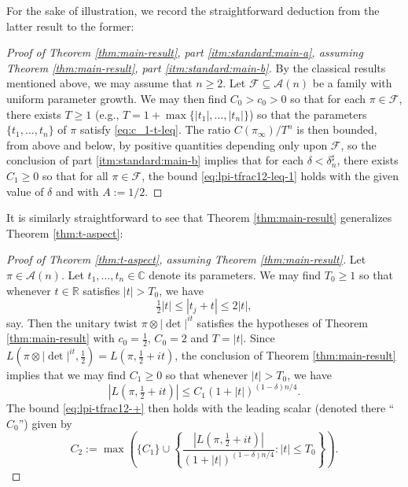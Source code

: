 For the sake of illustration, we record the straightforward deduction from the latter result to the former:
\begin{proof}[Proof of Theorem \ref{thm:main-result}, part \eqref{itm:standard:main-a}, assuming Theorem \ref{thm:main-result}, part \eqref{itm:standard:main-b}]
  By the classical results mentioned above, we may assume that $n \geq 2$.  Let $\mathcal{F} \subseteq \mathcal{A}(n)$ be a family with uniform parameter growth.  We may then find $C_0 > c_0 > 0$ so that for each $\pi \in \mathcal{F}$, there exists $T \geq 1$ (e.g., $T = 1 + \max \{|t_1|, \dotsc, |t_n|\}$) so that the parameters $\{t_1,\dotsc,t_n\}$ of $\pi$ satisfy \eqref{eq:c_1-t-leq}.  The ratio $C(\pi_\infty) / T^n$ is then bounded, from above and below, by positive quantities depending only upon $\mathcal{F}$, so the conclusion of part \eqref{itm:standard:main-b} implies that for each $\delta < \delta_n^\sharp$, there exists $C_1 \geq 0$ so that for all $\pi \in \mathcal{F}$, the bound \eqref{eq:lpi-tfrac12-leq-1} holds with the given value of $\delta$ and with $A := 1/2$.
\end{proof}

It is similarly straightforward to see that Theorem \ref{thm:main-result} generalizes Theorem \ref{thm:t-aspect}:
\begin{proof}[Proof of Theorem \ref{thm:t-aspect}, assuming Theorem \ref{thm:main-result}]
  Let $\pi \in \mathcal{A}(n)$.  Let $t_1, \dotsc, t_n \in \mathbb{C}$ denote its parameters.  We may find $T_0 \geq 1$ so that whenever $t \in \mathbb{R}$ satisfies $|t| > T_0$, we have
  \begin{equation*}
    \tfrac{1}{2} \lvert t \rvert \leq |t_j + t | \leq 2 \lvert t \rvert,
  \end{equation*}
  say.  Then the unitary twist $\pi \otimes |\det|^{i t}$ satisfies the hypotheses of Theorem \ref{thm:main-result} with $c_0 = \tfrac{1}{2}$, $C_0 = 2$ and $T = \lvert t \rvert$.  Since $L(\pi \otimes |\det|^{it}, \tfrac{1}{2}) = L(\pi, \tfrac{1}{2} + i t)$, the conclusion of Theorem \ref{thm:main-result} implies that we may find $C_1 \geq 0$ so that whenever $|t| > T_0$, we have
  \begin{equation*}
    |L(\pi, \tfrac{1}{2} + i t)| \leq C_1 ( 1 + |t|)^{(1 - \delta) n/4}.
  \end{equation*}
  The bound \eqref{eq:lpi-tfrac12-+} then holds with the leading scalar (denoted there ``$C_0$'') given by
  \begin{equation*}
    C_2 := \max \left(\{C_1\} \cup \left\{ \frac{|L(\pi,\tfrac{1}{2} + i t)|}{(1 + |t|)^{(1 - \delta) n/4}} : |t| \leq T_0 \right\}\right).
  \end{equation*}
\end{proof}

